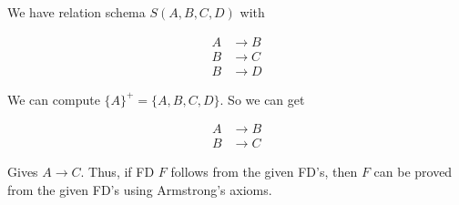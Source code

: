 \documentclass[../../main.tex]{subfiles}
\begin{document}
We have relation schema $S(A,B,C,D)$ with

\begin{align*}
  A &\to B \\
  B &\to C \\
  B &\to D
\end{align*}

We can compute $\{A\}^+ = \{A,B,C,D\}$. So we can get

\begin{align*}
  A &\to B \\
  B &\to C
\end{align*}

Gives $A \to C$. Thus, if FD $F$ follows from the given FD's,
then $F$ can be proved from the given FD's using Armstrong's
axioms.
\end{document}
